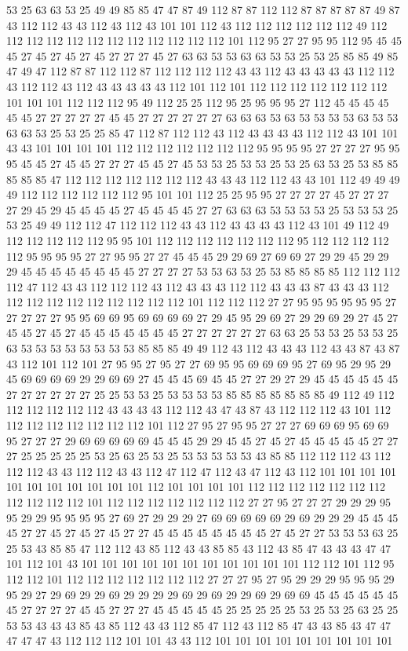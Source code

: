 53 25 63 63 53 25 49 49 85 85 47 47 87 49 112 87 87 112 112 87 87 87 87 87 49 87 43 112 112 43 43 112 43 112 43 101 101 112 43 112 112 112 112 112 112 49 112 112 112 112 112 112 112 112 112 112 112 112 101 112 95 27 27 95 95 112 95 45 45 45 27 45 27 45 27 45 27 27 27 45 27 63 63 53 53 63 63 53 53 25 53 25 85 85 49 85 47 49 47 112 87 87 112 112 87 112 112 112 112 43 43 112 43 43 43 43 43 112 112 43 112 112 43 112 43 43 43 43 43 112 101 112 101 112 112 112 112 112 112 112 101 101 101 112 112 112 95 49 112 25 25 112 95 25 95 95 95 27 112 45 45 45 45 45 45 27 27 27 27 27 45 45 27 27 27 27 27 27 63 63 63 53 63 53 53 53 53 63 53 53 63 63 53 25 53 25 25 85 47 112 87 112 112 43 112 43 43 43 43 112 112 43 101 101 43 43 101 101 101 101 112 112 112 112 112 112 112 95 95 95 95 27 27 27 27 95 95 95 45 45 27 45 45 27 27 27 45 45 27 45 53 53 25 53 53 25 53 25 63 53 25 53 85 85 85 85 85 47 112 112 112 112 112 112 112 43 43 43 112 112 43 43 101 112 49 49 49 49 112 112 112 112 112 112 95 101 101 112 25 25 95 95 27 27 27 27 45 27 27 27 27 29 45 29 45 45 45 45 27 45 45 45 45 27 27 63 63 63 53 53 53 53 25 53 53 53 25 53 25 49 49 112 112 47 112 112 112 43 43 112 43 43 43 43 112 43 101 49 112 49 112 112 112 112 112 95 95 101 112 112 112 112 112 112 112 95 112 112 112 112 112 95 95 95 95 27 27 95 95 27 27 45 45 45 29 29 69 27 69 69 27 29 29 45 29 29 29 45 45 45 45 45 45 45 45 27 27 27 27 53 53 63 53 25 53 85 85 85 85 112 112 112 112 47 112 43 43 112 112 112 43 112 43 43 43 112 112 43 43 43 87 43 43 43 112 112 112 112 112 112 112 112 112 112 101 112 112 112 27 27 95 95 95 95 95 95 27 27 27 27 27 95 95 69 69 95 69 69 69 69 27 29 45 95 29 69 27 29 29 69 29 27 45 27 45 45 27 45 27 45 45 45 45 45 45 45 27 27 27 27 27 27 63 63 25 53 53 25 53 53 25 63 53 53 53 53 53 53 53 53 85 85 85 49 49 112 43 112 43 43 43 112 43 43 87 43 87 43 112 101 112 101 27 95 95 27 95 27 27 69 95 95 69 69 69 95 27 69 95 29 95 29 45 69 69 69 69 29 29 69 69 27 45 45 45 69 45 45 27 27 29 27 29 45 45 45 45 45 45 27 27 27 27 27 27 25 25 53 53 25 53 53 53 53 85 85 85 85 85 85 85 49 112 49 112 112 112 112 112 112 43 43 43 43 112 112 43 47 43 87 43 112 112 112 43 101 112 112 112 112 112 112 112 112 101 112 27 95 27 95 95 27 27 27 69 69 69 95 69 69 95 27 27 27 29 69 69 69 69 69 45 45 45 29 29 45 45 27 45 27 45 45 45 45 45 27 27 27 25 25 25 25 25 53 25 63 25 53 25 53 53 53 53 53 43 85 85 112 112 112 43 112 112 112 43 43 112 112 43 43 112 47 112 47 112 43 47 112 43 112 101 101 101 101 101 101 101 101 101 101 101 112 101 101 101 101 112 112 112 112 112 112 112 112 112 112 112 101 112 112 112 112 112 112 112 27 27 95 27 27 27 29 29 29 95 95 29 29 95 95 95 95 27 69 27 29 29 29 27 69 69 69 69 69 29 69 29 29 29 45 45 45 45 27 27 45 27 45 27 45 27 27 45 45 45 45 45 45 45 45 27 45 27 27 53 53 53 63 25 25 53 43 85 85 47 112 112 43 85 112 43 43 85 85 43 112 43 85 47 43 43 43 47 47 101 112 101 43 101 101 101 101 101 101 101 101 101 101 101 112 112 101 112 95 112 112 101 112 112 112 112 112 112 112 27 27 27 95 27 95 29 29 29 95 95 95 29 95 29 27 29 69 29 29 69 29 29 29 29 69 29 69 29 29 69 29 69 69 45 45 45 45 45 45 45 27 27 27 27 45 45 27 27 27 45 45 45 45 45 25 25 25 25 25 53 25 53 25 63 25 25 53 53 43 43 43 85 43 85 112 43 43 112 85 47 112 43 112 85 47 43 43 85 43 47 47 47 47 47 43 112 112 112 101 101 43 43 112 101 101 101 101 101 101 101 101 101 
